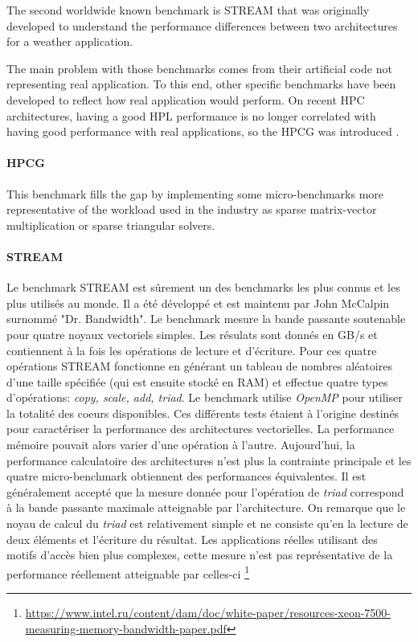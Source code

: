 The second worldwide known benchmark is STREAM \cite{HPC:stream} that was originally developed to understand the performance differences between two architectures for a weather application.

The main problem with those benchmarks comes from their artificial code not representing real application. To this end, other specific benchmarks have been developed to reflect how real application would perform. On recent HPC architectures, having a good HPL performance is no longer correlated with having good performance with real applications, so the HPCG was introduced \cite{HPC:hpcg}. 

\paragraph{HPCG} This benchmark fills the gap by implementing some micro-benchmarks more representative of the workload used in the industry as sparse matrix-vector multiplication or sparse triangular solvers.




    \paragraph{STREAM}
        Le benchmark STREAM est sûrement un des benchmarks les plus connus et les plus utilisés au monde. Il a été développé et est maintenu par John McCalpin surnommé "Dr. Bandwidth". Le benchmark mesure la bande passante soutenable pour quatre noyaux vectoriels simples. Les résulats sont donnés en GB/s et contiennent à la fois les opérations de lecture et d'écriture. Pour ces quatre opérations STREAM fonctionne en générant un tableau de nombres aléatoires d'une taille spécifiée (qui est ensuite stocké en RAM) et effectue quatre types d'opérations: \textit{copy, scale, add, triad}.  Le benchmark utilise \textit{OpenMP} pour utiliser la totalité des coeurs disponibles. Ces différents tests étaient à l'origine destinés pour caractériser la performance des architectures vectorielles. La performance mémoire pouvait alors varier d'une opération à l'autre. Aujourd'hui, la performance calculatoire des architectures n'est plus la contrainte principale et les quatre micro-benchmark obtiennent des performances équivalentes. Il est généralement accepté que la mesure donnée pour l'opération de \textit{triad} correspond à la bande passante maximale atteignable par l'architecture. On remarque que le noyau de calcul du \textit{triad} est relativement simple et ne consiste qu'en la lecture de deux éléments et l'écriture du résultat. Les applications réelles utilisant des motifs d'accès bien plus complexes, cette mesure n'est pas représentative de la performance réellement atteignable par celles-ci \footnote{\url{https://www.intel.ru/content/dam/doc/white-paper/resources-xeon-7500-measuring-memory-bandwidth-paper.pdf}}
        

